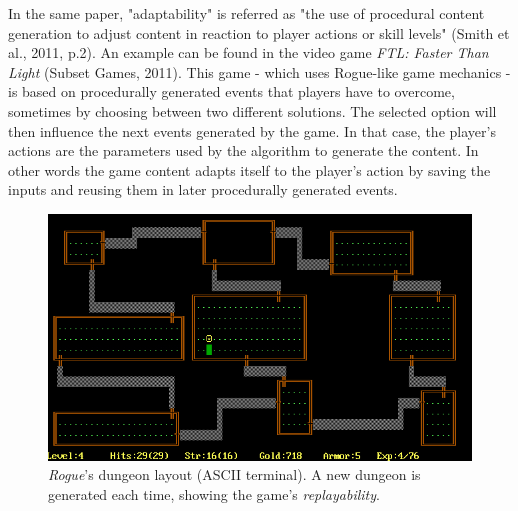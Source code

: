 In the same paper, "adaptability" is referred as "the use of procedural content generation to adjust content in reaction to player actions or skill levels" (Smith et al., 2011, p.2)\cite{pdf:pcgbased}. An example can be found in the video game \textit{FTL: Faster Than Light} (Subset Games, 2011)\cite{game:ftl}. This game - which uses Rogue-like game mechanics - is based on procedurally generated events that players have to overcome, sometimes by choosing between two different solutions. The selected option will then influence the next events generated by the game. In that case, the player's actions are the parameters used by the algorithm to generate the content. In other words the game content adapts itself to the player's action by saving the inputs and reusing them in later procedurally generated events.

\begin{figure}[!ht]
    \centering
    \includegraphics[scale=0.4]{Images/Rogue.png}
    \caption{\textit{Rogue}'s dungeon layout (ASCII terminal). A new dungeon is generated each time, showing the game's \textit{replayability}.}
    \label{fig:Rogue}
\end{figure}


